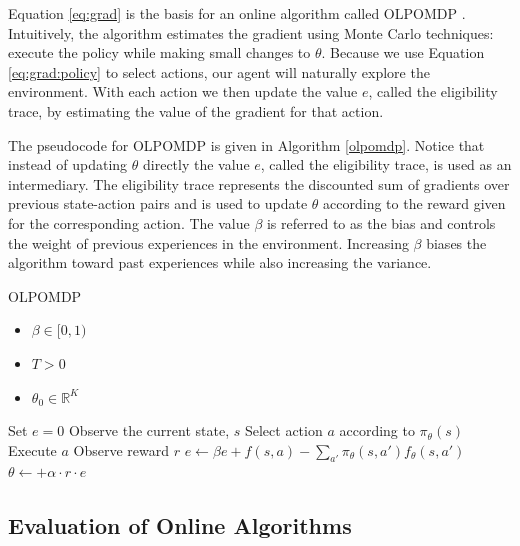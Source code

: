 Equation \ref{eq:grad} is the basis for an online algorithm called OLPOMDP \cite{olpomdp}. Intuitively, the algorithm estimates the gradient using Monte Carlo techniques: execute the policy while making small changes to $\theta$. Because we use Equation \ref{eq:grad:policy} to select actions, our agent will naturally explore the environment. With each action we then update the value $e$, called the eligibility trace, by estimating the value of the gradient for that action.

The pseudocode for OLPOMDP is given in Algorithm \ref{olpomdp}. Notice that instead of updating $\theta$ directly the value $e$, called the eligibility trace, is used as an intermediary. The eligibility trace represents the discounted sum of gradients over previous state-action pairs and is used to update $\theta$ according to the reward given for the corresponding action. The value $\beta$ is referred to as the bias and controls the weight of previous experiences in the environment. Increasing $\beta$ biases the algorithm toward past experiences while also increasing the variance. 

\begin{algorithm}
\caption{OLPOMDP}
\label{olpomdp}
    {\fontsize{12}{10}\selectfont
    \begin{algorithmic}[1]
        \REQUIRE
            \begin{itemize} 
                \item $\beta \in [0,1)$ 
                \item $T > 0$ 
                \item $\theta_0 \in \mathbb{R}^K$ 
            \end{itemize}
    \STATE Set $e = 0$
        \STATE Observe the current state, $s$
        \STATE Select action $a$ according to $\pi_\theta(s)$
        \STATE Execute $a$
        \STATE Observe reward $r$
        \STATE $e \leftarrow \beta e + f(s,a) - \sum\limits_{a'}\pi_\theta(s,a')f_\theta(s,a')$
        \STATE $\theta \leftarrow + \alpha \cdot r \cdot e$
    \ENDFOR
    \end{algorithmic}
    }
\end{algorithm}

\subsection{Evaluation of Online Algorithms}

